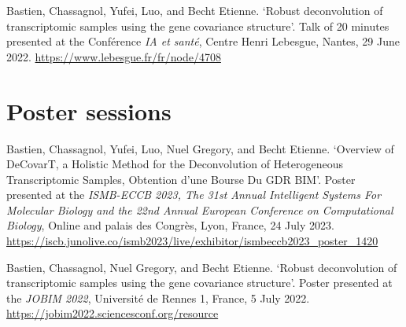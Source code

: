 Bastien, Chassagnol, Yufei, Luo, and Becht Etienne. ‘Robust deconvolution of transcriptomic samples using the gene covariance structure’. Talk of 20 minutes presented at the Conférence \emph{IA et santé}, Centre Henri Lebesgue, Nantes, 29 June 2022. \url{https://www.lebesgue.fr/fr/node/4708}\newline

\section{Poster sessions}

Bastien, Chassagnol, Yufei, Luo, Nuel Gregory, and Becht Etienne. ‘Overview of DeCovarT, a Holistic Method for the Deconvolution of Heterogeneous Transcriptomic Samples, Obtention d’une Bourse Du GDR BIM’. Poster presented at the \emph{ISMB-ECCB 2023, The 31st Annual  Intelligent Systems For Molecular Biology and the 22nd Annual European Conference on Computational Biology}, Online and palais des Congrès, Lyon, France, 24 July 2023.
 \url{https://iscb.junolive.co/ismb2023/live/exhibitor/ismbeccb2023_poster_1420}\newline


Bastien, Chassagnol, Nuel Gregory, and Becht Etienne. ‘Robust deconvolution of transcriptomic samples using the gene covariance structure’. Poster presented at the \emph{JOBIM 2022}, Université de Rennes 1, France, 5 July 2022. 
\url{https://jobim2022.sciencesconf.org/resource}
